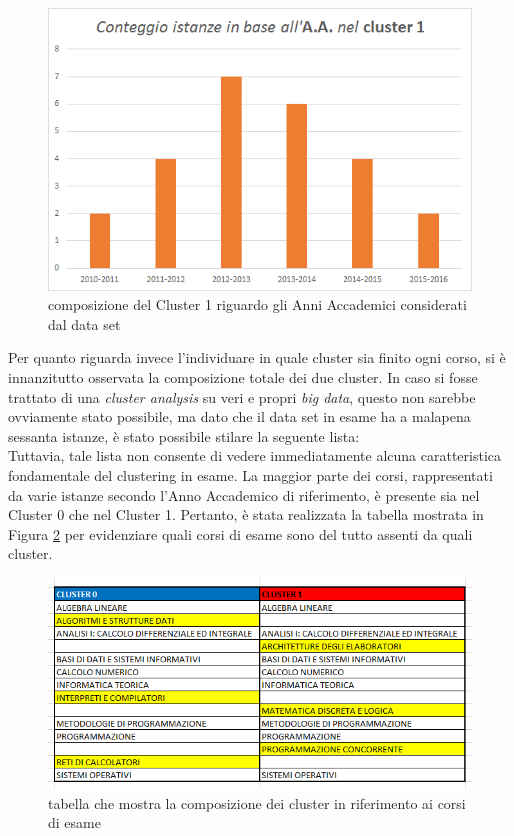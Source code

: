         \begin{figure}
            \centering
            \caption{composizione del Cluster 1 riguardo gli Anni Accademici considerati dal data set}
            \label{AA2}
            \includegraphics[scale=0.75]{../cluster/min_kmeans_2cl_AA_cl1.png}
        \end{figure}

        Per quanto riguarda invece l'individuare in quale cluster sia finito ogni corso, si è innanzitutto osservata la composizione totale dei due cluster. In caso si fosse trattato di una \textit{cluster analysis} su veri e propri \textit{big data}, questo non sarebbe ovviamente stato possibile, ma dato che il data set in esame ha a malapena sessanta istanze, è stato possibile stilare la seguente lista: \\

        

        Tuttavia, tale lista non consente di vedere immediatamente alcuna caratteristica fondamentale del clustering in esame. La maggior parte dei corsi, rappresentati da varie istanze secondo l'Anno Accademico di riferimento, è presente sia nel Cluster $0$ che nel Cluster 1. Pertanto, è stata realizzata la tabella mostrata in Figura \ref{tabella} per evidenziare quali corsi di esame sono del tutto assenti da quali cluster.\\

        \begin{figure}
            \centering
            \caption{tabella che mostra la composizione dei cluster in riferimento ai corsi di esame}
            \label{tabella}
            \includegraphics[scale=0.65]{../cluster/min_kmeans_2cl_corsi_cluster.png}
        \end{figure}

